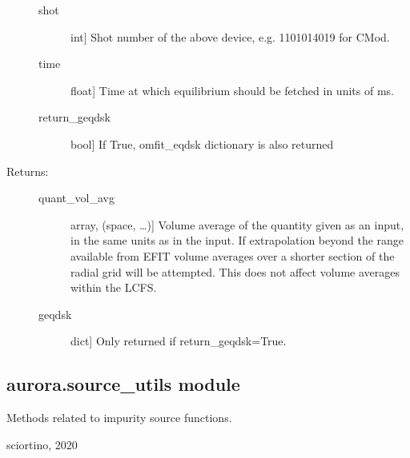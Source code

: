 \documentclass[letterpaper,10pt,english]{sphinxmanual}
\begin{document}
\begin{fulllineitems}
\begin{description}
\begin{description}
\item[{shot}] \leavevmode{[}int{]}
Shot number of the above device, e.g. 1101014019 for C\sphinxhyphen{}Mod.

\item[{time}] \leavevmode{[}float{]}
Time at which equilibrium should be fetched in units of ms.

\item[{return\_geqdsk}] \leavevmode{[}bool{]}
If True, omfit\_eqdsk dictionary is also returned

\end{description}

\item[{Returns:}] \leavevmode\begin{description}
\item[{quant\_vol\_avg}] \leavevmode{[}array, (space, …){]}
Volume average of the quantity given as an input, in the same units as in the input.
If extrapolation beyond the range available from EFIT volume averages over a shorter section
of the radial grid will be attempted. This does not affect volume averages within the LCFS.

\item[{geqdsk}] \leavevmode{[}dict{]}
Only returned if return\_geqdsk=True.

\end{description}

\end{description}

\end{fulllineitems}



\subsection{aurora.source\_utils module}
\label{\detokenize{aurora:module-aurora.source_utils}}\label{\detokenize{aurora:aurora-source-utils-module}}
Methods related to impurity source functions.

sciortino, 2020
\end{document}
